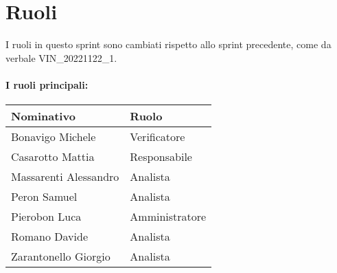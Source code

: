 \section{Ruoli}

I ruoli in questo sprint sono cambiati rispetto allo sprint precedente, come da verbale VIN\_20221122\_1.

\paragraph{I ruoli principali:}

\begin{center}
    \begin{tabularx}{\textwidth}{X l}
        
        \rowcolor{gray!30} \textbf{Nominativo} & \textbf{Ruolo}\\
        
        \hline

        Bonavigo Michele & Verificatore \\
        \rowcolor{gray!10}Casarotto Mattia & Responsabile \\
        Massarenti Alessandro & Analista \\
        \rowcolor{gray!10}Peron Samuel & Analista \\
        Pierobon Luca & Amministratore \\
        \rowcolor{gray!10}Romano Davide & Analista \\
        Zarantonello Giorgio & Analista \\

    \end{tabularx}
\end{center}
